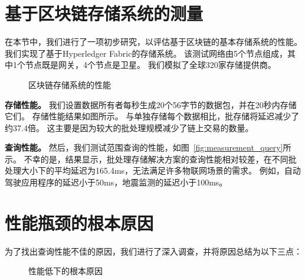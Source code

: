\section{基于区块链存储系统的测量}
在本节中，我们进行了一项初步研究，以评估基于区块链的基本存储系统的性能。
我们实现了基于Hyperledger Fabric的存储系统。
该测试网络由5个节点组成，其中1个节点既是网关，4个节点是卫星。
我们模拟了全球320家存储提供商。
\begin{figure*}[t]
    \centering
    \begin{minipage}{0.8\linewidth}
	    \centering
        \hfill
        \caption{区块链存储系统的性能} 
    \end{minipage}
\end{figure*}

\textbf{存储性能。}
我们设置数据所有者每秒生成20个56字节的数据包，并在20秒内存储它们。
存储性能结果如图所示。
与单独存储每个数据相比，批存储将延迟减少了约37.4倍。
这主要是因为较大的批处理规模减少了链上交易的数量。

\textbf{查询性能。}
然后，我们测试范围查询的性能，如图~\autoref{fig:measurement_query}所示。
不幸的是，结果显示，批处理存储解决方案的查询性能相对较差，在不同批处理大小下的平均延迟为165.4ms，无法满足许多物联网场景的需求。
例如，自动驾驶应用程序的延迟小于50ms，地震监测的延迟小于100ms。

\section{性能瓶颈的根本原因}
为了找出查询性能不佳的原因，我们进行了深入调查，并将原因总结为以下三点：

\begin{figure*}[t]
    \centering
    \begin{minipage}{1\linewidth}
	    \centering
        \hfill
        \hfill
        \caption{性能低下的根本原因} 
    \end{minipage}
\end{figure*}

